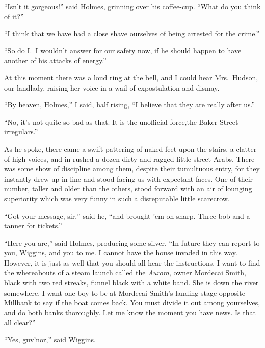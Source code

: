 \documentclass[12pt,english,oneside]{book}
\begin{document}
{}``Isn't it gorgeous!'' said Holmes, grinning over his coffee-cup.
{}``What do you think of it?''

{}``I think that we have had a close shave ourselves of being arrested
for the crime.''

{}``So do I.\  I wouldn't answer for our safety now, if he should
happen to have another of his attacks of energy.''

At this moment there was a loud ring at the bell, and I could hear
Mrs.\ Hudson, our landlady, raising her voice in a wail of expostulation
and dismay.

{}``By heaven, Holmes,'' I said, half rising, {}``I believe that
they are really after us.''

{}``No, it's not quite so bad as that. It is the unofficial force,\mdsh{---}the
Baker Street irregulars.''

As he spoke, there came a swift pattering of naked feet upon the stairs,
a clatter of high voices, and in rushed a dozen dirty and ragged little
street-Arabs. There was some show of discipline among them, despite
their tumultuous entry, for they instantly drew up in line and stood
facing us with expectant faces. One of their number, taller and older
than the others, stood forward with an air of lounging superiority
which was very funny in such a disreputable little scarecrow.

{}``Got your message, sir,'' said he, {}``and brought 'em on sharp.
Three bob and a tanner for tickets.''

{}``Here you are,'' said Holmes, producing some silver. {}``In
future they can report to you, Wiggins, and you to me. I cannot have
the house invaded in this way. However, it is just as well that you
should all hear the instructions. I want to find the whereabouts of
a steam launch called the \emph{Aurora}, owner Mordecai Smith, black
with two red streaks, funnel black with a white band. She is down
the river somewhere. I want one boy to be at Mordecai Smith's landing-stage
opposite Millbank to say if the boat comes back. You must divide it
out among yourselves, and do both banks thoroughly. Let me know the
moment you have news. Is that all clear?''

{}``Yes, guv'nor,'' said Wiggins.
\end{document}
